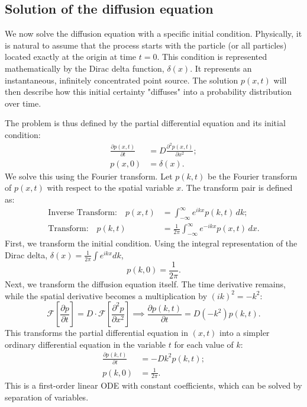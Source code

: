 \subsection{Solution of the diffusion equation}
We now solve the diffusion equation with a specific initial condition. Physically, it is natural to assume that the process starts with the particle (or all particles) located exactly at the origin at time $t=0$. This condition is represented mathematically by the Dirac delta function, $\delta(x)$. It represents an instantaneous, infinitely concentrated point source. The solution $p(x,t)$ will then describe how this initial certainty "diffuses" into a probability distribution over time.

The problem is thus defined by the partial differential equation and its initial condition:
\begin{align*}
    \frac{\partial p(x,t)}{\partial t} &= D \frac{\partial^2 p(x,t)}{\partial x^2}; \\
    p(x,0) &= \delta(x).
\end{align*}
We solve this using the Fourier transform. Let $p(k,t)$ be the Fourier transform of $p(x,t)$ with respect to the spatial variable $x$. The transform pair is defined as:
\begin{align*}
    \text{Inverse Transform:} \quad p(x,t) &= \int_{-\infty}^{\infty} e^{ikx} p(k,t) \,dk; \\
    \text{Transform:} \quad p(k,t) &= \frac{1}{2\pi} \int_{-\infty}^{\infty} e^{-ikx} p(x,t) \,dx.
\end{align*}
First, we transform the initial condition. Using the integral representation of the Dirac delta, $\delta(x) = \frac{1}{2\pi} \int e^{ikx} dk$,  
\[
p(k,0) = \frac{1}{2\pi}.
\]
Next, we transform the diffusion equation itself. The time derivative remains, while the spatial derivative becomes a multiplication by $(ik)^2 = -k^2$:
\[
\mathcal{F}\left[\frac{\partial p}{\partial t}\right] = D \cdot \mathcal{F}\left[\frac{\partial^2 p}{\partial x^2}\right] \implies \frac{\partial p(k,t)}{\partial t} = D(-k^2)p(k,t).
\]
This transforms the partial differential equation in $(x,t)$ into a simpler ordinary differential equation in the variable $t$ for each value of $k$:
\begin{align*}
    \frac{\partial p(k,t)}{\partial t} &= -Dk^2 p(k,t); \\
    p(k,0) &= \frac{1}{2\pi}.
\end{align*}
This is a first-order linear ODE with constant coefficients, which can be solved by separation of variables.

